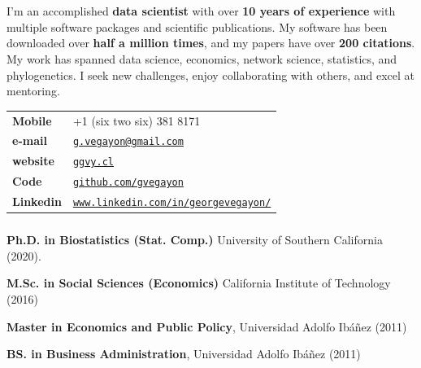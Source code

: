 \documentclass[letterpaper, 9pt]{article}
\newcommand{\myorange}{myteal!70!black}
\newcommand{\darkorange}{\myorange !50!black}
\renewcommand{\bf}{\bfseries\color{\myorange}}
\renewcommand{\textbf}[1]{{\bfseries\color{\myorange}#1}}
\def\name{George G. Vega Yon, Ph.D.}
\renewenvironment{itemize}{
  \begin{list}{}{
    \setlength{\leftmargin}{0.3cm}
  }
}{
  \end{list}
}
\begin{document}
	\part*{\color{darkgray}{\name}} 
	
	\vspace{-.25cm}
	\bigskip


	\begin{minipage}{.9\linewidth}
	\raggedright
	I'm an accomplished \textbf{data scientist} with over \textbf{10 years of experience} with multiple software packages and scientific publications. My software has been downloaded over \textbf{half a million times}, and my papers have over \textbf{200 citations}. My work has spanned data science, economics, network science, statistics, and phylogenetics. I seek new challenges, enjoy collaborating with others, and excel at mentoring.
	\end{minipage}

	\bigskip



\begin{minipage}{0.50\linewidth}
  \begin{tabular}{>{\bfseries}p{.2\linewidth}p{.79\linewidth}}
    Mobile & +1 (six two six) 381 8171 \\
    e-mail & \href{mailto:g.vegayon@gmail.com}{\tt g.vegayon@gmail.com} \\
    website & \href{https://ggvy.cl}{\tt ggvy.cl} \\
    Code & \href{https://github.com/gvegayon}{\tt github.com/gvegayon}\\
    Linkedin & \href{https://www.linkedin.com/in/georgevegayon/}{\tt www.linkedin.com/in/georgevegayon/} %
  \end{tabular}
\end{minipage}


\section*{\color{\darkorange}{Education}}
\vspace{-.25cm}

\begin{itemize}
\item 
{\bf Ph.D. in Biostatistics (Stat. Comp.)} University of Southern California (2020).

{\bf M.Sc. in Social Sciences (Economics)} California Institute of Technology (2016)

{\bf Master in Economics and Public Policy}, Universidad Adolfo Ib\'a\~nez (2011)

{\bf BS. in Business Administration}, Universidad Adolfo Ib\'a\~nez (2011)
\end{itemize}
\end{document}

